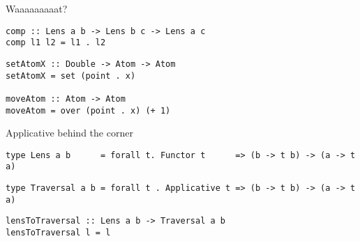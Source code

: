 \documentclass[presentation,aspectratio=169,8pt]{beamer}
\begin{document}
\begin{frame}[label={sec:org11ab74c},fragile]{Waaaaaaaaat?}
 \begin{verbatim}
comp :: Lens a b -> Lens b c -> Lens a c
comp l1 l2 = l1 . l2
\end{verbatim}

\pause

\begin{verbatim}
setAtomX :: Double -> Atom -> Atom
setAtomX = set (point . x)

moveAtom :: Atom -> Atom
moveAtom = over (point . x) (+ 1)
\end{verbatim}
\end{frame}

\begin{frame}[label={sec:org9a5c21b},fragile]{Applicative behind the corner}
 \begin{verbatim}
type Lens a b      = forall t. Functor t      => (b -> t b) -> (a -> t a)
\end{verbatim}

\pause

\begin{verbatim}
type Traversal a b = forall t . Applicative t => (b -> t b) -> (a -> t a)
\end{verbatim}

\pause

\begin{verbatim}
lensToTraversal :: Lens a b -> Traversal a b
lensToTraversal l = l
\end{verbatim}
\end{frame}
\end{document}
